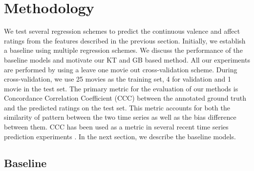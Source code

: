\documentclass{article}
\begin{document}

\section{Methodology}

We test several regression schemes to predict the continuous valence and affect ratings from the features described in the previous section.
Initially, we establish a baseline using multiple regression schemes.
We discuss the performance of the baseline models and motivate our KT and GB based method.
All our experiments are performed by using a leave one movie out cross-validation scheme.
During cross-validation, we use 25 movies as the training set, 4 for validation and 1 movie in the test set.
The primary metric for the evaluation of our methods is Concordance Correlation Coefficient (CCC) \cite{liao2000note} between the annotated ground truth and the predicted ratings on the test set.
This metric accounts for both the similarity of pattern between the two time series as well as the bias difference between them. 
CCC has been used as a metric in several recent time series prediction experiments \cite{valstar2016avec}. 
In the next section, we describe the baseline models.

\subsection{Baseline}
\end{document}
